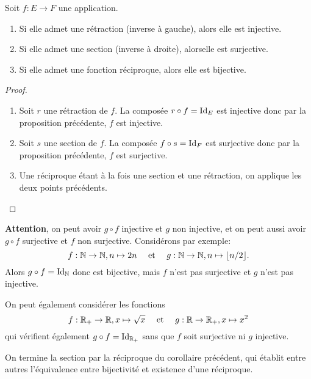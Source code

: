 \begin{corollaire}[de la proposition]\label{bijective-si-reciproque}
Soit $f : E\to F$ une application.
\begin{enumerate}
\item Si elle admet une rétraction (inverse à gauche), alors elle est injective.
\item Si elle admet une section (inverse à droite), alorselle est surjective.
\item Si elle admet une fonction réciproque, alors elle est bijective.
\end{enumerate}
\end{corollaire}
\begin{proof}
\begin{enumerate}
\item Soit $r$ une rétraction de $f$. La composée $r\circ f = \operatorname{Id}_E$ est injective donc par la proposition précédente, $f$ est injective.
\item Soit $s$ une section de $f$. La composée $f \circ s= \operatorname{Id}_F$ est surjective donc par la proposition précédente, $f$ est surjective.
\item Une réciproque étant à la fois une section et une rétraction, on applique les deux points précédents.
\end{enumerate}
\end{proof}


\begin{remarque}
\textbf{Attention}, on peut avoir $g\circ f$ injective et $g$ non injective, et on peut aussi avoir $g\circ f$ surjective et $f$ non surjective. Considérons par exemple:
\[
f : \mathbb{N}\to \mathbb{N}, n\mapsto 2n
\quad \text{ et }\quad
g : \mathbb{N}\to \mathbb{N}, n\mapsto \lfloor n/2\rfloor.
\]
Alors $g\circ f = \operatorname{Id}_{\mathbb{N}}$ donc est bijective, mais $f$ n'est pas surjective et $g$ n'est pas injective.

On peut également considérer les fonctions
\[
f : \mathbb{R}_+\to \mathbb{R}, x\mapsto \sqrt x
\quad \text{ et }\quad
g : \mathbb{R}\to \mathbb{R}_+, x\mapsto x^2
\]
qui vérifient également $g\circ f=\operatorname{Id}_{\mathbb{R}_+}$ sans que $f$ soit surjective ni $g$ injective.
\end{remarque}



On termine la section par la réciproque du corollaire précédent, qui établit entre autres l'équivalence entre bijectivité et existence d'une réciproque.

